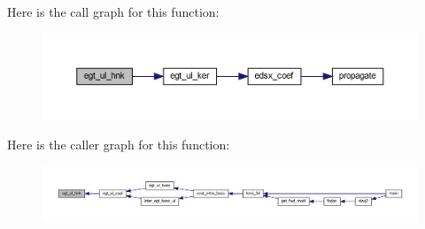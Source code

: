 Here is the call graph for this function\+:\nopagebreak
\begin{figure}[H]
\begin{center}
\leavevmode
\includegraphics[width=350pt]{Leroi_8f90_a1d1da4021109f56adcc9ad84d89cd1b7_cgraph}
\end{center}
\end{figure}
Here is the caller graph for this function\+:\nopagebreak
\begin{figure}[H]
\begin{center}
\leavevmode
\includegraphics[width=350pt]{Leroi_8f90_a1d1da4021109f56adcc9ad84d89cd1b7_icgraph}
\end{center}
\end{figure}
\mbox{\label{Leroi_8f90_a8f7098d7bc36902fbbda312874c15120}} 
